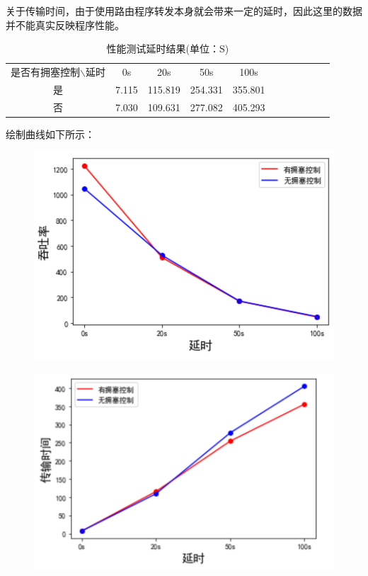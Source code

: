 \documentclass[UTF8,a4paper,10pt]{ctexart}
\begin{document}
关于传输时间，由于使用路由程序转发本身就会带来一定的延时，因此这里的数据并不能真实反映程序性能。
\begin{table}[!htbp]
  \centering
  \begin{tabular}{ccccccccccc}
  \toprule  
  是否有拥塞控制$\backslash$延时& 0s& 20s& 50s& 100s\\
  是& 7.115& 115.819& 254.331& 355.801\\
  否& 7.030& 109.631& 277.082& 405.293\\
  \bottomrule
  \end{tabular}
  \caption{性能测试延时结果(单位：S)}
\end{table}

绘制曲线如下所示：
\begin{figure}[H]
    \centering
    \includegraphics[scale=0.6]{计网11.png}
    \label{fig:11}
\end{figure}
\begin{figure}[H]
    \centering
    \includegraphics[scale=0.6]{计网12.png}
    \label{fig:12}
\end{figure}
\end{document}
